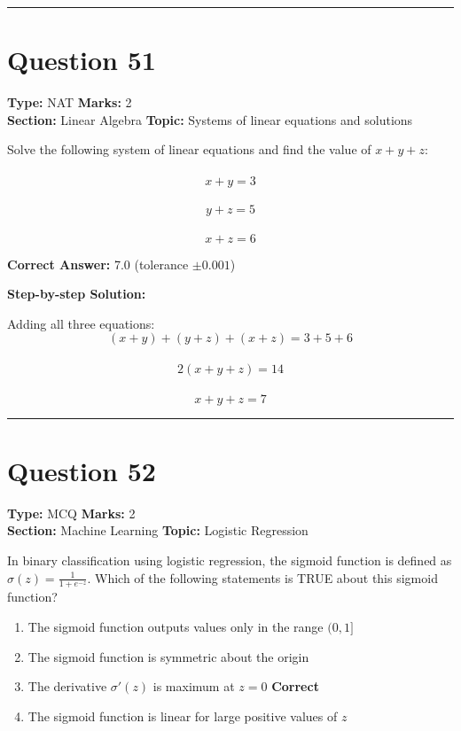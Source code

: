 \documentclass[11pt]{article}
\begin{document}
\vspace{0.8em}
\hrule
\vspace{0.4em}
\section*{Question 51}
\textbf{Type:} NAT \hfill \textbf{Marks:} 2\\
\textbf{Section:} Linear Algebra \hfill \textbf{Topic:} Systems of linear equations and solutions

Solve the following system of linear equations and find the value of \(x + y + z\):\\
\\
\[x + y = 3\]\\
\[y + z = 5\]\\
\[x + z = 6\]



\textbf{Correct Answer:} 7.0 (tolerance \(\pm 0.001\))

\textbf{Step-by-step Solution:}

Adding all three equations:\\
\[(x + y) + (y + z) + (x + z) = 3 + 5 + 6\]\\
\[2(x + y + z) = 14\]\\
\[x + y + z = 7\]

\vspace{0.8em}
\hrule
\vspace{0.4em}
\section*{Question 52}
\textbf{Type:} MCQ \hfill \textbf{Marks:} 2\\
\textbf{Section:} Machine Learning \hfill \textbf{Topic:} Logistic Regression

In binary classification using logistic regression, the sigmoid function is defined as \(\sigma(z) = \frac{1}{1 + e^{-z}}\). Which of the following statements is TRUE about this sigmoid function?


\begin{enumerate}[label=\textbf{\Alph*.}, leftmargin=1.8em]
\item The sigmoid function outputs values only in the range \((0, 1]\)\item The sigmoid function is symmetric about the origin\item The derivative \(\sigma'(z)\) is maximum at \(z = 0\) \hfill {\color{gategreen}\textbf{Correct}}\item The sigmoid function is linear for large positive values of \(z\)\end{enumerate}
\end{document}

